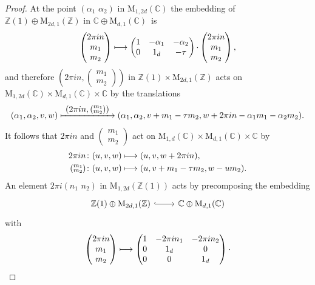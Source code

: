 \documentclass[JEP,XML,SOM,Unicode,NoFloatCountersInSection]{cedram}
\def\mto{\mathchoice{\longmapsto}{\mapsto}{\mapsto}{\mapsto}}
\def\To#1{\mathchoice{\xrightarrow{\textstyle\kern4pt#1\kern3pt}}{\stackrel{#1}{\longrightarrow}}{}{}}
\def\Mto#1{\mathrel{\mapstochar\To{#1}}}
\theoremstyle{plain}
\theoremstyle{definition}
\numberwithin{equation}{subsection}
\renewcommand{\C}{\mathbb C}
\newcommand{\Z}{\mathbb Z}
\newcommand{\rmM}{\mathrm{M}}
\begin{document}
\begin{proof}
At the point $(\alpha_1\,\,\alpha_2)$ in
$\rmM_{1,2d}(\C)$ the embedding of $\Z(1)\oplus\rmM_{2d,1}(\Z)$ in
$\C\oplus \rmM_{d,1}(\C)$~is
\[
\begin{pmatrix}
2\pi in\\ m_1\\ m_2
\end{pmatrix}
\mto
\begin{pmatrix}
1 & -\alpha_1 & -\alpha_2\\0 & 1_d & -\tau
\end{pmatrix}{\cdot}
\begin{pmatrix}
2\pi in\\ m_1\\ m_2
\end{pmatrix},
\]
and therefore $(2\pi in, (\substack{m_1\\m_2}))$ in
$\Z(1)\times\rmM_{2d,1}(\Z)$ acts on $\rmM_{1,2d}(\C)\times
\rmM_{d,1}(\C)\times\C$ by the translations
\[
(\alpha_1,\alpha_2,v,w) \Mto{(2\pi in, (\substack{m_1\\m_2}))}
(\alpha_1,\alpha_2,v+m_1-\tau m_2,w+2\pi in-\alpha_1m_1-\alpha_2m_2).
\]
It follows that $2\pi i n$ and $(\substack{m_1\\m_2})$ act on
$\rmM_{1,d}(\C)\times\rmM_{d,1}(\C)\times\C$ by
\begin{equation}
\label{eq:action_m}
\begin{aligned}
2\pi i n\colon (u,v,w) & \mto (u,v,w+2\pi i n),\\
(\substack{m_1\\m_2})\colon (u,v,w) & \mto (u,v+m_1-\tau m_2,w-um_2).
\end{aligned}
\end{equation}
An element $2\pi i(n_1\,\, n_2)$ in $\rmM_{1,2d}(\Z(1))$ acts by precomposing
the embedding
\[
\begin{tikzcd}
\Z(1)\oplus\rmM_{2d,1}(\Z) \ar[r,hook] & \C\oplus \rmM_{d,1}(\C)
\end{tikzcd}
\]
with
\[
\begin{pmatrix}
2\pi in \\ m_1\\ m_2
\end{pmatrix}
 \mto
\begin{pmatrix}
1 & -2\pi in_1 & -2\pi i n_2\\
0 & 1_d & 0 \\
0 & 0 & 1_d
\end{pmatrix} {\cdot}
\]
\end{proof}
\end{document}
